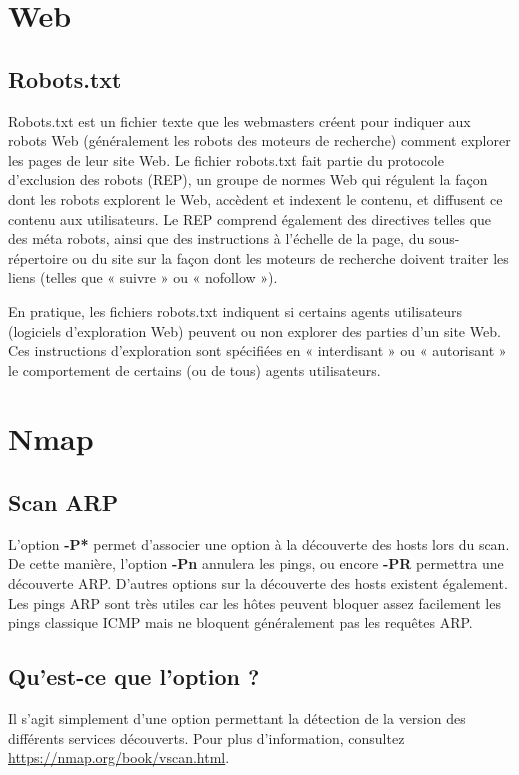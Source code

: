 \documentclass[a4paper]{article}
\begin{document}
\newpage \appendix
\section{Web}
\subsection{Robots.txt} \cite{1} \label{app:robots}
Robots.txt est un fichier texte que les webmasters créent pour indiquer aux robots Web (généralement les robots des moteurs de recherche) comment explorer les pages de leur site Web. Le fichier robots.txt fait partie du protocole d'exclusion des robots (REP), un groupe de normes Web qui régulent la façon dont les robots explorent le Web, accèdent et indexent le contenu, et diffusent ce contenu aux utilisateurs. Le REP comprend également des directives telles que des méta robots, ainsi que des instructions à l'échelle de la page, du sous-répertoire ou du site sur la façon dont les moteurs de recherche doivent traiter les liens (telles que « suivre » ou « nofollow »).

En pratique, les fichiers robots.txt indiquent si certains agents utilisateurs (logiciels d'exploration Web) peuvent ou non explorer des parties d'un site Web. Ces instructions d'exploration sont spécifiées en « interdisant » ou « autorisant » le comportement de certains (ou de tous) agents utilisateurs.

\section{Nmap}\label{app:nmap}

\subsection{Scan ARP}\label{app:ARP}
L'option \textbf{-P*} permet d'associer une option à la découverte des hosts lors du scan. De cette manière, l'option \textbf{-Pn} annulera les pings, ou encore \textbf{-PR} permettra une découverte ARP. D'autres options sur la découverte des hosts existent également. Les pings ARP sont très utiles car les hôtes peuvent bloquer assez facilement les pings classique ICMP mais ne bloquent généralement pas les requêtes ARP.

\subsection{Qu'est-ce que l'option  ?}
Il s'agit simplement d'une option permettant la détection de la version des différents services découverts. Pour plus d'information, consultez \url{https://nmap.org/book/vscan.html}.
\end{document}
